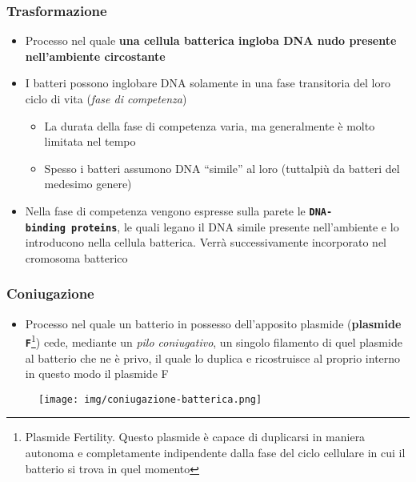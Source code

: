 \documentclass[italian,]{article}
\providecommand{\tightlist}{%
  \setlength{\itemsep}{0pt}\setlength{\parskip}{0pt}}
\begin{document}
\hypertarget{trasformazione}{%
\subsubsection{Trasformazione}\label{trasformazione}}

\begin{itemize}
\tightlist
\item
  Processo nel quale \textbf{una cellula batterica ingloba DNA nudo
  presente nell'ambiente circostante}
\item
  I batteri possono inglobare DNA solamente in una fase transitoria del
  loro ciclo di vita (\emph{fase di competenza})

  \begin{itemize}
  \tightlist
  \item
    La durata della fase di competenza varia, ma generalmente è molto
    limitata nel tempo
  \item
    Spesso i batteri assumono DNA ``simile'' al loro (tuttalpiù da
    batteri del medesimo genere)
  \end{itemize}
\item
  Nella fase di competenza vengono espresse sulla parete le
  \textbf{\texttt{DNA-binding\ proteins}}, le quali legano il DNA simile
  presente nell'ambiente e lo introducono nella cellula batterica. Verrà
  successivamente incorporato nel cromosoma batterico
\end{itemize}

\hypertarget{coniugazione}{%
\subsubsection{Coniugazione}\label{coniugazione}}

\begin{itemize}
\tightlist
\item
  Processo nel quale un batterio in possesso dell'apposito plasmide
  (\textbf{plasmide \texttt{F}}\footnote{Plasmide Fertility. Questo
    plasmide è capace di duplicarsi in maniera autonoma e completamente
    indipendente dalla fase del ciclo cellulare in cui il batterio si
    trova in quel momento}) cede, mediante un \emph{pilo coniugativo},
  un singolo filamento di quel plasmide al batterio che ne è privo, il
  quale lo duplica e ricostruisce al proprio interno in questo modo il
  plasmide F
\end{itemize}

\begin{figure}[H]
\centering
\texttt{[image: img/coniugazione-batterica.png]}
\end{figure}
\end{document}
